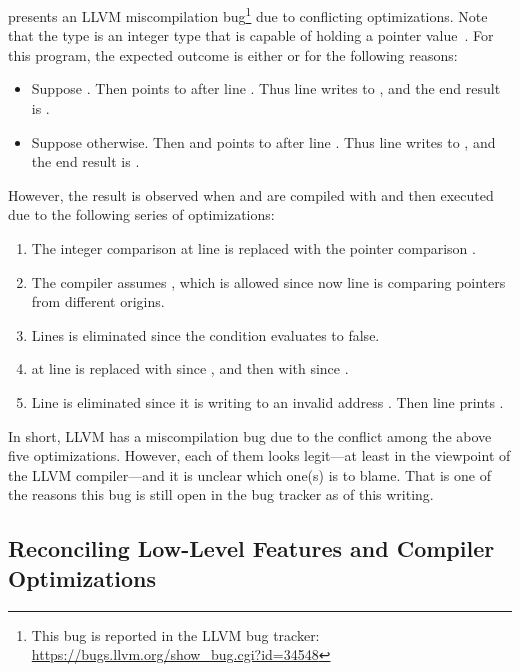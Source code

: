  presents an LLVM miscompilation bug\footnote{This bug is reported in the
  LLVM bug tracker: \url{https://bugs.llvm.org/show_bug.cgi?id=34548}} due to conflicting
optimizations.  Note that the type  is an integer type that is capable of holding a
pointer value~\cite[\S7.20.1.4]{c18}.  For this program, the expected outcome is either  or  for the following reasons:
%
\begin{itemize}
\item Suppose .  Then  points to  after line .  Thus line
   writes  to , and the end result is .

\item Suppose otherwise.  Then  and  points to  after line .
  Thus line  writes  to , and the end result is .
\end{itemize}
%
However, the result  is observed when  and  are compiled with
 and then executed due to the following series of optimizations:
\begin{enumerate}
\item The integer comparison  at line  is replaced with the pointer
  comparison .
\item The compiler assumes , which is allowed since now line  is comparing
  pointers from different origins.
\item Lines  is eliminated since the condition  evaluates to false.
\item {} at line  is replaced with  since , and then
  with  since .
\item Line  is eliminated since it is writing to an invalid address .  Then line
   prints .
\end{enumerate}
%
\noindent In short, LLVM has a miscompilation bug due to the conflict among the above five
optimizations.  However, each of them looks legit---at least in the viewpoint of the LLVM
compiler---and it is unclear which one(s) is to blame.  That is one of the reasons this bug is still
open in the bug tracker as of this writing.


\subsection{Reconciling Low-Level Features and Compiler Optimizations}

